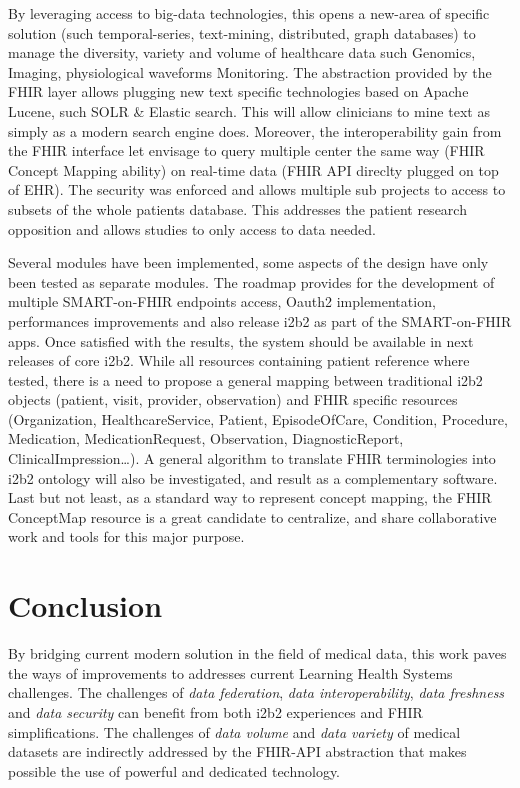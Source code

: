 \documentclass{amia}
\begin{document}
By leveraging access to big-data technologies, this opens a new-area of specific solution (such temporal-series, text-mining, distributed, graph databases)  to manage the diversity, variety and volume of healthcare data such Genomics\cite{Alterovitz_2015}, Imaging, physiological waveforms Monitoring. The abstraction provided by the FHIR layer allows plugging new text specific technologies based on Apache Lucene, such SOLR \& Elastic search. This will allow clinicians to mine text as simply as a modern search engine does. Moreover, the interoperability gain from the FHIR interface let envisage to query multiple center the same way (FHIR Concept Mapping ability) on real-time data (FHIR API direclty plugged on top of EHR). The security was enforced and allows multiple sub projects to access to subsets of the whole patients database. This addresses the patient research opposition and allows studies to only access to data needed.

Several modules have been implemented, some aspects of the design have only been tested as separate modules. The roadmap provides for the development of multiple SMART-on-FHIR endpoints access, Oauth2 implementation, performances improvements and also release i2b2 as part of the SMART-on-FHIR apps. Once satisfied with the results, the system should be available in next releases of core i2b2. While all resources containing patient reference where tested, there is a need to propose a general mapping between traditional i2b2 objects (patient, visit, provider, observation) and FHIR specific resources (Organization, HealthcareService, Patient, EpisodeOfCare, Condition, Procedure, Medication, MedicationRequest, Observation, DiagnosticReport, ClinicalImpression\ldots). A general algorithm to translate FHIR terminologies into i2b2 ontology will also be investigated, and result as a complementary software. Last but not least, as a standard way to represent concept mapping, the FHIR ConceptMap resource is a great candidate to centralize, and share collaborative work and tools for this major purpose.


\section*{Conclusion}

By bridging current modern solution in the field of medical data, this work paves the ways of improvements to addresses current Learning Health Systems challenges.
The challenges of \textit{data federation}, \textit{data interoperability}, \textit{data freshness} and \textit{data security} can benefit from both i2b2 experiences and 
FHIR simplifications.
The challenges of \textit{data volume} and \textit{data variety} of medical datasets are indirectly addressed by the FHIR-API abstraction that makes possible the use of 
powerful and dedicated technology.
\end{document}
